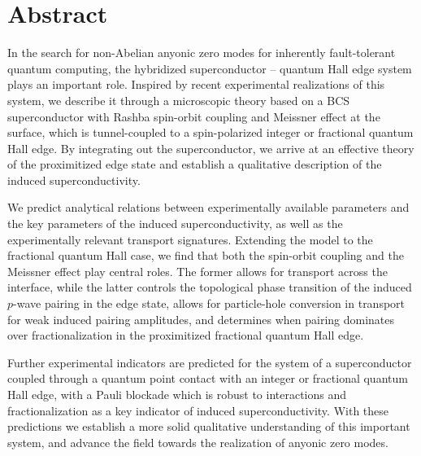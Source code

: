 \chapter{Abstract}

In the search for non-Abelian anyonic zero modes for inherently fault-tolerant quantum computing, the hybridized superconductor -- quantum Hall edge system plays an important role. Inspired by recent experimental realizations of this system, we describe it through a microscopic theory based on a BCS superconductor with Rashba spin-orbit coupling and Meissner effect at the surface, which is tunnel-coupled to a spin-polarized integer or fractional quantum Hall edge. By integrating out the superconductor, we arrive at an effective theory of the proximitized edge state and establish a qualitative description of the induced superconductivity. 

We predict analytical relations between experimentally available parameters and the key parameters of the induced superconductivity, as well as the experimentally relevant transport signatures. Extending the model to the fractional quantum Hall case, we find that both the spin-orbit coupling and the Meissner effect play central roles. The former allows for transport across the interface, while the latter controls the topological phase transition of the induced $p$-wave pairing in the edge state, allows for particle-hole conversion in transport for weak induced pairing amplitudes, and determines when pairing dominates over fractionalization in the proximitized fractional quantum Hall edge.

Further experimental indicators are predicted for the system of a superconductor coupled through a quantum point contact with an integer or fractional quantum Hall edge, with a Pauli blockade which is robust to interactions and fractionalization as a key indicator of induced superconductivity. With these predictions we establish a more solid qualitative understanding of this important system, and advance the field towards the realization of anyonic zero modes.